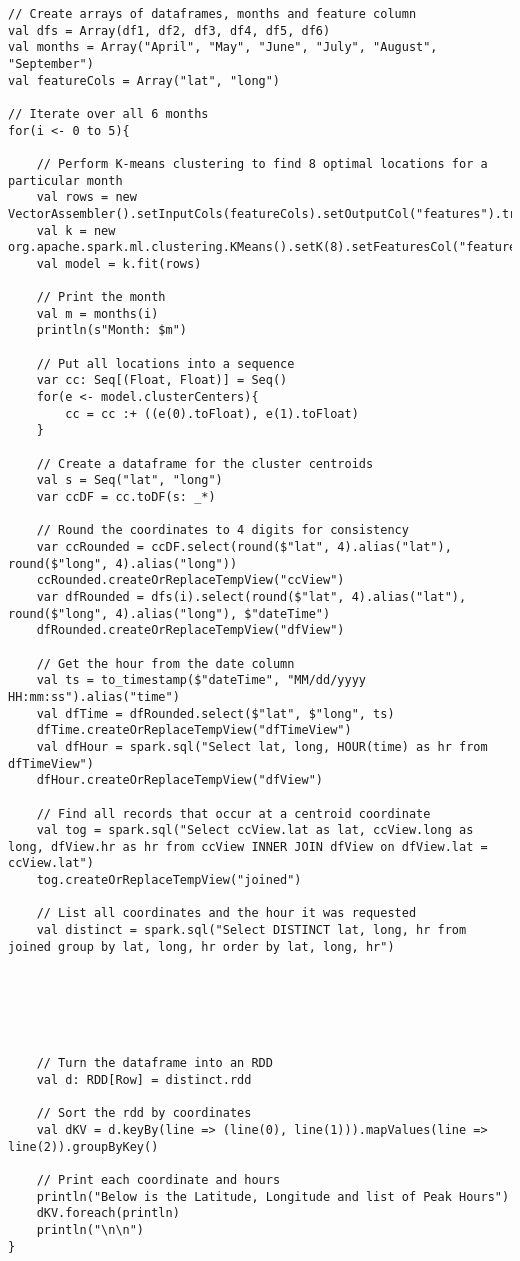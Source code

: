 \documentclass[11pt]{article}
\begin{document}
\begin{lstlisting}
// Create arrays of dataframes, months and feature column 
val dfs = Array(df1, df2, df3, df4, df5, df6)
val months = Array("April", "May", "June", "July", "August", "September")
val featureCols = Array("lat", "long")

// Iterate over all 6 months 
for(i <- 0 to 5){

	// Perform K-means clustering to find 8 optimal locations for a particular month 
	val rows = new VectorAssembler().setInputCols(featureCols).setOutputCol("features").transform(dfs(i))
	val k = new org.apache.spark.ml.clustering.KMeans().setK(8).setFeaturesCol("features").setPredictionCol("location")
	val model = k.fit(rows)

	// Print the month 
	val m = months(i)
	println(s"Month: $m")

	// Put all locations into a sequence 
	var cc: Seq[(Float, Float)] = Seq()
	for(e <- model.clusterCenters){
		cc = cc :+ ((e(0).toFloat), e(1).toFloat)
	}

	// Create a dataframe for the cluster centroids 
	val s = Seq("lat", "long")
	var ccDF = cc.toDF(s: _*)

	// Round the coordinates to 4 digits for consistency 
	var ccRounded = ccDF.select(round($"lat", 4).alias("lat"), round($"long", 4).alias("long"))
	ccRounded.createOrReplaceTempView("ccView")
	var dfRounded = dfs(i).select(round($"lat", 4).alias("lat"), round($"long", 4).alias("long"), $"dateTime")
	dfRounded.createOrReplaceTempView("dfView")

	// Get the hour from the date column 
	val ts = to_timestamp($"dateTime", "MM/dd/yyyy HH:mm:ss").alias("time")
	val dfTime = dfRounded.select($"lat", $"long", ts)
	dfTime.createOrReplaceTempView("dfTimeView")
	val dfHour = spark.sql("Select lat, long, HOUR(time) as hr from dfTimeView")
	dfHour.createOrReplaceTempView("dfView")

	// Find all records that occur at a centroid coordinate 
	val tog = spark.sql("Select ccView.lat as lat, ccView.long as long, dfView.hr as hr from ccView INNER JOIN dfView on dfView.lat = ccView.lat")
	tog.createOrReplaceTempView("joined")

	// List all coordinates and the hour it was requested 
	val distinct = spark.sql("Select DISTINCT lat, long, hr from joined group by lat, long, hr order by lat, long, hr")






	// Turn the dataframe into an RDD 
	val d: RDD[Row] = distinct.rdd

	// Sort the rdd by coordinates 
	val dKV = d.keyBy(line => (line(0), line(1))).mapValues(line => line(2)).groupByKey()

	// Print each coordinate and hours 
	println("Below is the Latitude, Longitude and list of Peak Hours")
	dKV.foreach(println)
	println("\n\n")
}
\end{lstlisting} 
\end{document}
